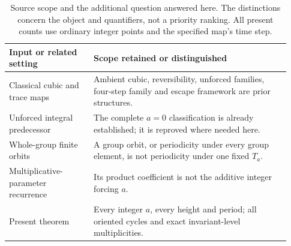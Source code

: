 \begin{table}[htbp]
\centering\small
\caption{Source scope and the additional question answered here.
The distinctions concern the object and quantifiers, not a priority
ranking. All present counts use ordinary integer points and the
specified map's time step.}
\label{tab:ownership}
\begin{tabular}{@{}>{\raggedright\arraybackslash}p{0.28\linewidth}p{0.65\linewidth}@{}}
\toprule
Input or related setting & Scope retained or distinguished \\
\midrule
Classical cubic and trace maps & Ambient cubic, reversibility,
unforced families, four-step family and escape framework are
prior structures. \\
Unforced integral predecessor & The complete $a=0$ classification
is already established; it is reproved where needed here. \\
Whole-group finite orbits & A group orbit, or periodicity under
every group element, is not periodicity under one fixed $T_a$. \\
Multiplicative-parameter recurrence & Its product coefficient is
not the additive integer forcing $a$. \\
Present theorem & Every integer $a$, every height and period;
all oriented cycles and exact invariant-level multiplicities. \\
\bottomrule
\end{tabular}
\end{table}
